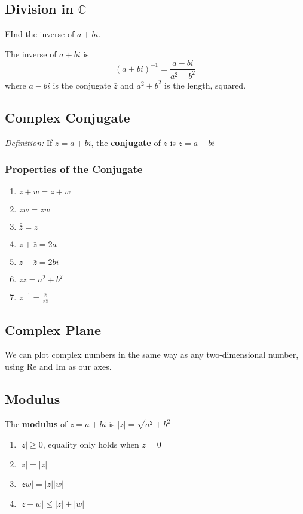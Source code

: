 \documentclass[12pt]{article}
\begin{document}
\subsection*{Division in $\mathbb{C}$}
FInd the inverse of $a + bi$.

The inverse of $a + bi$ is \[ (a + bi)^{-1} = \frac{a - bi}{a^2 + b^2} \] where $a-bi$ is the conjugate $\bar{z}$ and $a^2 + b^2$ is the length, squared.

\subsection*{Complex Conjugate}
\textit{Definition:} If $z = a + bi$, the {\bf conjugate} of $z$ is $\bar{z} = a - bi$

\subsubsection*{Properties of the Conjugate}
\begin{enumerate}
\item $\bar{z+w} = \bar{z} + \bar{w}$
\item $\bar{zw} = \bar{z}\bar{w}$
\item $\bar{\bar{z}} = z$
\item $z + \bar{z} = 2a$
\item $z - \bar{z} = 2bi$
\item $z\bar{z} = a^2 + b^2$
\item $z^{-1} = \frac{\bar{z}}{z\bar{z}}$
\end{enumerate}

\subsection*{Complex Plane}
We can plot complex numbers in the same way as any two-dimensional number, using Re and Im as our axes.

\subsection*{Modulus}
The {\bf modulus} of $z = a + bi$ is $|z| = \sqrt{a^2+b^2}$

\begin{enumerate}
\item $|z| \geq 0$, equality only holds when $z = 0$
\item $|\bar{z}| = |z|$
\item $|zw| = |z||w|$
\item $|z + w| \leq |z| + |w|$
\end{enumerate}
\end{document}

